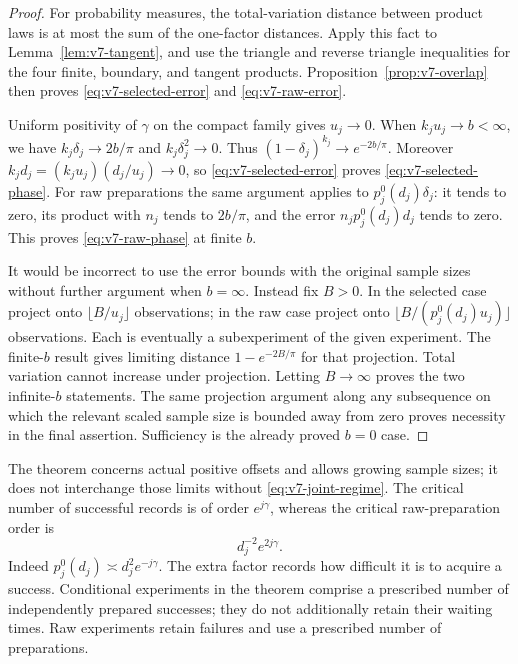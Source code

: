 \begin{proof}
For probability measures, the total-variation distance between product laws is at most the sum of the one-factor distances. Apply this fact to Lemma~\ref{lem:v7-tangent}, and use the triangle and reverse triangle inequalities for the four finite, boundary, and tangent products. Proposition~\ref{prop:v7-overlap} then proves \eqref{eq:v7-selected-error} and \eqref{eq:v7-raw-error}.

Uniform positivity of $\gamma$ on the compact family gives $u_j\to0$. When $k_ju_j\to b<\infty$, we have $k_j\delta_j\to2b/\pi$ and $k_j\delta_j^2\to0$. Thus $(1-\delta_j)^{k_j}\to e^{-2b/\pi}$. Moreover $k_jd_j=(k_ju_j)(d_j/u_j)\to0$, so \eqref{eq:v7-selected-error} proves \eqref{eq:v7-selected-phase}. For raw preparations the same argument applies to $p_j^0(d_j)\delta_j$: it tends to zero, its product with $n_j$ tends to $2b/\pi$, and the error $n_jp_j^0(d_j)d_j$ tends to zero. This proves \eqref{eq:v7-raw-phase} at finite $b$.

It would be incorrect to use the error bounds with the original sample sizes without further argument when $b=\infty$. Instead fix $B>0$. In the selected case project onto $\lfloor B/u_j\rfloor$ observations; in the raw case project onto $\lfloor B/(p_j^0(d_j)u_j)\rfloor$ observations. Each is eventually a subexperiment of the given experiment. The finite-$b$ result gives limiting distance $1-e^{-2B/\pi}$ for that projection. Total variation cannot increase under projection. Letting $B\to\infty$ proves the two infinite-$b$ statements. The same projection argument along any subsequence on which the relevant scaled sample size is bounded away from zero proves necessity in the final assertion. Sufficiency is the already proved $b=0$ case.
\end{proof}

The theorem concerns actual positive offsets and allows growing sample sizes; it does not interchange those limits without \eqref{eq:v7-joint-regime}. The critical number of successful records is of order $e^{j\gamma}$, whereas the critical raw-preparation order is
\begin{equation}\label{eq:v7-critical-cost}
                        d_j^{-2}e^{2j\gamma}.
\end{equation}
Indeed $p_j^0(d_j)\asymp d_j^2e^{-j\gamma}$. The extra factor records how difficult it is to acquire a success. Conditional experiments in the theorem comprise a prescribed number of independently prepared successes; they do not additionally retain their waiting times. Raw experiments retain failures and use a prescribed number of preparations.


